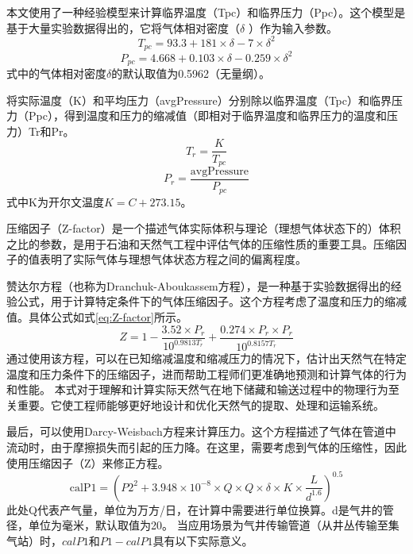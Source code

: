 本文使用了一种经验模型来计算临界温度（Tpc）和临界压力（Ppc）。这个模型是基于大量实验数据得出的，它将气体相对密度（$\delta$ ）作为输入参数。
\begin{equation}
    T_{pc} = 93.3 + 181 \times \delta - 7 \times \delta^2
\end{equation}
\begin{equation}
    P_{pc} = 4.668 + 0.103 \times \delta - 0.259 \times \delta^2
\end{equation}
式中的气体相对密度$\delta$的默认取值为0.5962（无量纲）。

将实际温度（K）和平均压力（avgPressure）分别除以临界温度（Tpc）和临界压力（Ppc），得到温度和压力的缩减值（即相对于临界温度和临界压力的温度和压力）Tr和Pr。
\begin{equation}
    T_r = \frac{K}{T_{pc}}
\end{equation}
\begin{equation}
    P_r = \frac{\text{avgPressure}}{P_{pc}}
\end{equation}
式中K为开尔文温度$K = C + 273.15$。

压缩因子（Z-factor）是一个描述气体实际体积与理论（理想气体状态下的）体积之比的参数，是用于石油和天然气工程中评估气体的压缩性质的重要工具。压缩因子的值表明了实际气体与理想气体状态方程之间的偏离程度。

赞达尔方程\cite{Dranchuk1975CalculationOZ}（也称为Dranchuk-Aboukassem方程），是一种基于实验数据得出的经验公式，用于计算特定条件下的气体压缩因子。这个方程考虑了温度和压力的缩减值。具体公式如式\eqref{eq:Z-factor}所示。
\begin{equation}
    Z = 1 - \frac{3.52 \times P_r}{10^{0.9813T_r}} + \frac{0.274 \times P_r \times P_r}{10^{0.8157T_r}}
    \label{eq:Z-factor}
\end{equation}
通过使用该方程，可以在已知缩减温度和缩减压力的情况下，估计出天然气在特定温度和压力条件下的压缩因子，进而帮助工程师们更准确地预测和计算气体的行为和性能。
本式对于理解和计算实际天然气在地下储藏和输送过程中的物理行为至关重要。它使工程师能够更好地设计和优化天然气的提取、处理和运输系统。

最后，可以使用Darcy-Weisbach方程\cite{brown2002history}来计算压力。这个方程描述了气体在管道中流动时，由于摩擦损失而引起的压力降。在这里，需要考虑到气体的压缩性，因此使用压缩因子（Z）来修正方程。
\begin{equation}
    \text{calP1} = \left(P2^2 + 3.948 \times 10^{-8} \times Q \times Q \times \delta \times K \times \frac{L}{d^{1.6}}\right)^{0.5}
\end{equation}
此处Q代表产气量，单位为万方/日，在计算中需要进行单位换算。d是气井的管径，单位为毫米，默认取值为20。
当应用场景为气井传输管道（从井丛传输至集气站）时，$calP1$和$P1 - calP1$具有以下实际意义。


